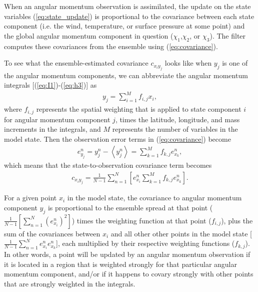 When an angular momentum observation is assimilated, the update on the state variables (\ref{eq:state_update}) is proportional to the covariance between each state component (i.e. the wind, temperature, or surface pressure at some point) and the global angular momentum component in question ($\chi_1$,$\chi_2$, or $\chi_3$). 
The filter computes these covariances from the ensemble using (\ref{eq:covariance}).


To see what the ensemble-estimated covariance $c_{x_i y_j}$ looks like when $y_j$ is one of the angular momentum components, we can abbreviate the angular momentum integrals [(\ref{eq:I1})-(\ref{eq:h3})] as
%
\begin{eqnarray}
y_j = \sum_{i=1}^M f_{i,j} x_i,
\end{eqnarray}
%
where $f_{i,j}$ represents the spatial weighting that is applied to state component $i$ for angular momentum component $j$, times the latitude, longitude, and mass increments in the integrals, and $M$ represents the number of variables in the model state.
Then the observation error terms in (\ref{eq:covariance}) become
\begin{eqnarray}
	e_{y_j}^n = y_j^n - \left< y_j^n \right>
	= \sum_{k=1}^{M}f_{k,j}e_{x_k}^n,
\end{eqnarray}
which means that the state-to-observation covariance term becomes
\begin{eqnarray}
	c_{x_i y_j} = \frac{1}{N-1}
	\sum_{n=1}^{N}
	\left[
	e_{x_i}^n
	\sum_{k=1}^{M} f_{k,j}e_{x_k}^n
	\right].
	\label{eq:state_to_obs_covariance}
\end{eqnarray}

For a given point $x_i$ in the model state, the covariance to angular momentum component $y_j$ is proportional to the ensemble spread at that point ($\frac{1}{N-1}\left[\sum_{n=1}^N \left( e^n_{x_i} \right)^2 \right]$) times the weighting function at that point ($f_{i,j}$), plus the sum of the covariances between $x_i$ and all other other points in the model state [$\frac{1}{N-1}\sum_{n=1}^N e_{x_i}^n e_{x_k}^n$], each multiplied by their respective weighting functions ($f_{k,j}$). 
In other words, a point will be updated by an angular momentum observation if it is located in a region that is weighted strongly for that particular angular momentum component, and/or if it happens to covary strongly with other points that are strongly weighted in the integrals.  

